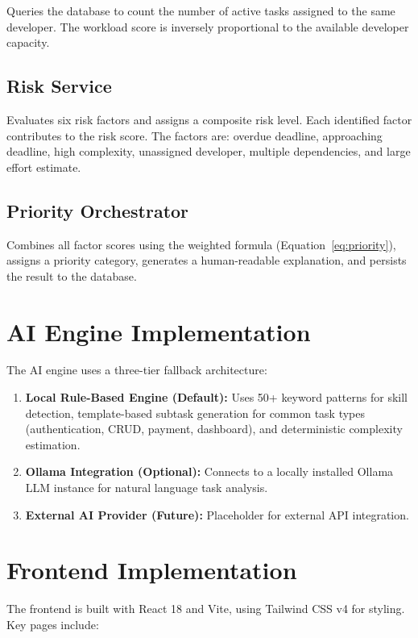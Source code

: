 \documentclass[12pt,a4paper,oneside]{report}
\begin{document}
Queries the database to count the number of active tasks assigned to the same developer. The workload score is inversely proportional to the available developer capacity.

\subsection{Risk Service}

Evaluates six risk factors and assigns a composite risk level. Each identified factor contributes to the risk score. The factors are: overdue deadline, approaching deadline, high complexity, unassigned developer, multiple dependencies, and large effort estimate.

\subsection{Priority Orchestrator}

Combines all factor scores using the weighted formula (Equation~\ref{eq:priority}), assigns a priority category, generates a human-readable explanation, and persists the result to the database.

\section{AI Engine Implementation}

The AI engine uses a three-tier fallback architecture:

\begin{enumerate}[noitemsep]
  \item \textbf{Local Rule-Based Engine (Default):} Uses 50+ keyword patterns for skill detection, template-based subtask generation for common task types (authentication, CRUD, payment, dashboard), and deterministic complexity estimation.
  \item \textbf{Ollama Integration (Optional):} Connects to a locally installed Ollama LLM instance for natural language task analysis.
  \item \textbf{External AI Provider (Future):} Placeholder for external API integration.
\end{enumerate}

\section{Frontend Implementation}

The frontend is built with React 18 and Vite, using Tailwind CSS v4 for styling. Key pages include:
\end{document}
